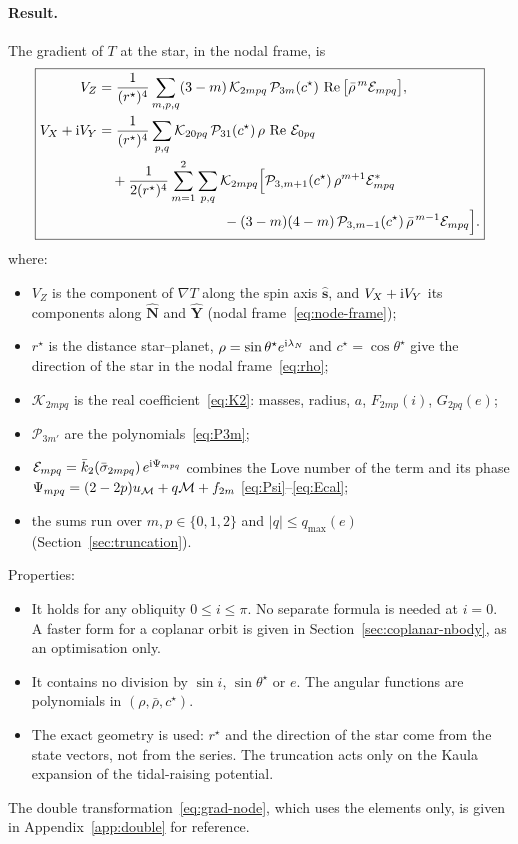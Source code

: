 \paragraph{Result.} The gradient of $T$ at the star, in the nodal frame, is
\begin{equation}
  \boxed{\begin{aligned}
  V_Z&=\frac{1}{(r^\star)^4}\sum_{m,p,q}(3-m)\,\mathcal K_{2mpq}\,\mathcal P_{3m}(c^\star)\,\operatorname{Re}\big[\bar\rho^{\,m}\mathcal E_{mpq}\big],\\
  V_X+\mathrm{i} V_Y&=\frac{1}{(r^\star)^4}\sum_{p,q}\mathcal K_{20pq}\,\mathcal P_{31}(c^\star)\,\rho\,\operatorname{Re}\,\mathcal E_{0pq}\\
  &\quad+\frac{1}{2(r^\star)^4}\sum_{m=1}^{2}\sum_{p,q}\mathcal K_{2mpq}\Big[\mathcal P_{3,m+1}(c^\star)\,\rho^{m+1}\mathcal E^*_{mpq}\\
  &\hspace{9em}-(3-m)(4-m)\,\mathcal P_{3,m-1}(c^\star)\,\bar\rho^{\,m-1}\mathcal E_{mpq}\Big].
  \end{aligned}} \label{eq:impl-single}
\end{equation}
where:
\begin{itemize}
  \item $V_Z$ is the component of $\nabla T$ along the spin axis $\hat{\mathbf s}$, and $V_X+\mathrm{i} V_Y$ its components along $\hat{\mathbf N}$ and $\hat{\mathbf Y}$ (nodal frame~\eqref{eq:node-frame});
  \item $r^\star$ is the distance star--planet, $\rho=\sin\theta^\star e^{\mathrm{i}\lambda_N}$ and $c^\star=\cos\theta^\star$ give the direction of the star in the nodal frame~\eqref{eq:rho};
  \item $\mathcal K_{2mpq}$ is the real coefficient~\eqref{eq:K2}: masses, radius, $a$, $F_{2mp}(i)$, $G_{2pq}(e)$;
  \item $\mathcal P_{3m'}$ are the polynomials~\eqref{eq:P3m};
  \item $\mathcal E_{mpq}=\bar k_2(\bar\sigma_{2mpq})\,e^{\mathrm{i}\Psi_{mpq}}$ combines the Love number of the term and its phase $\Psi_{mpq}=(2-2p)u_{\mathcal{M}}+q\mathcal{M}+f_{2m}$ \eqref{eq:Psi}--\eqref{eq:Ecal};
  \item the sums run over $m,p\in\{0,1,2\}$ and $|q|\le q_{\max}(e)$ (Section~\ref{sec:truncation}).
\end{itemize}
Properties:
\begin{itemize}
  \item It holds for any obliquity $0\le i\le\pi$. No separate formula is needed at $i=0$. A faster form for a coplanar orbit is given in Section~\ref{sec:coplanar-nbody}, as an optimisation only.
  \item It contains no division by $\sin i$, $\sin\theta^\star$ or $e$. The angular functions are polynomials in $(\rho,\bar\rho,c^\star)$.
  \item The exact geometry is used: $r^\star$ and the direction of the star come from the state vectors, not from the series. The truncation acts only on the Kaula expansion of the tidal-raising potential.
\end{itemize}
The double transformation~\eqref{eq:grad-node}, which uses the elements only, is given in Appendix~\ref{app:double} for reference.

